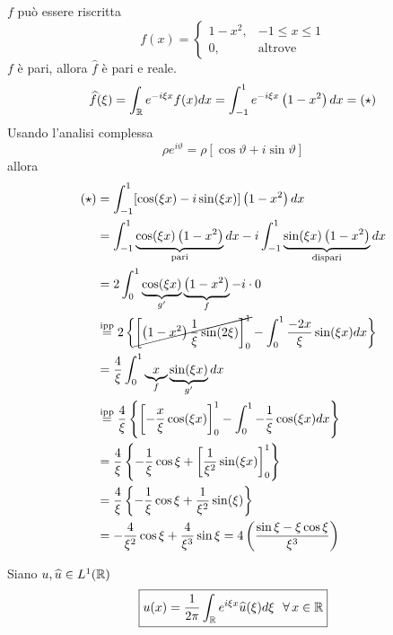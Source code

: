 $f$ può essere riscritta
\begin{equation*}
f(x) =
\begin{cases}
1 - x^{2}, & - 1 \leq x \leq 1\\
0, & \text{altrove}
\end{cases}
\end{equation*}
$f$ è pari, allora $\hat{f}$ è pari e reale.
\begin{equation*}
\widehat{f}(\xi) = \int_{\mathbb{R}} e^{- i\xi x} f(x) dx = \int^{1}_{- 1} e^{- i\xi x}\left(1 - x^{2}\right) dx = (\star)
\end{equation*}
Usando l'analisi complessa
\begin{equation*}
\rho e^{i\vartheta} = \rho [\cos \vartheta + i\sin \vartheta ]
\end{equation*}
allora
\begin{align*}
(\star) & = \int^{1}_{- 1}[\cos(\xi x) - i\sin(\xi x)]\left(1 - x^{2}\right) dx\\
 & = \int^{1}_{- 1}\underbrace{\cos(\xi x)\left(1 - x^{2}\right)}_{\text{pari}} dx - i\int^{1}_{- 1}\underbrace{\sin(\xi x)\left(1 - x^{2}\right)}_{\text{dispari}} dx\\
 & = 2\int^{1}_{0}\underbrace{\cos(\xi x)}_{g'}\underbrace{\left(1 - x^{2}\right)}_{f} - i \cdot 0\\
 & \overset{\text{ipp}}{=} 2\left\{\cancel{\left[\left(1 - x^{2}\right)\frac{1}{\xi}\sin(2\xi)\right]^{1}_{0}} - \int^{1}_{0}\frac{- 2x}{\xi}\sin(\xi x) dx\right\}\\
 & = \frac{4}{\xi}\int^{1}_{0}\underbrace{x}_{f}\underbrace{\sin(\xi x)}_{g'} dx\\
 & \overset{\text{ipp}}{=}\frac{4}{\xi}\left\{\left[ - \frac{x}{\xi}\cos(\xi x)\right]^{1}_{0} - \int^{1}_{0} - \frac{1}{\xi}\cos(\xi x) dx\right\}\\
 & = \frac{4}{\xi}\left\{- \frac{1}{\xi}\cos \xi + \left[\frac{1}{\xi^{2}}\sin(\xi x)\right]^{1}_{0}\right\}\\
 & = \frac{4}{\xi}\left\{- \frac{1}{\xi}\cos \xi + \frac{1}{\xi^{2}}\sin(\xi)\right\}\\
 & = - \frac{4}{\xi^{2}}\cos \xi + \frac{4}{\xi^{3}}\sin \xi = 4\left(\frac{\sin \xi - \xi \cos \xi}{\xi^{3}}\right)
\end{align*}
\begin{thm}
 Siano $u, \widehat{u} \in L^{1}(\mathbb{R})$
\begin{equation*}
\boxed{u(x) = \frac{1}{2\pi}\int_{\RR} e^{i\xi x}\hat{u}(\xi) d\xi \ \ \forall x\in \RR}
\end{equation*}
\end{thm}
